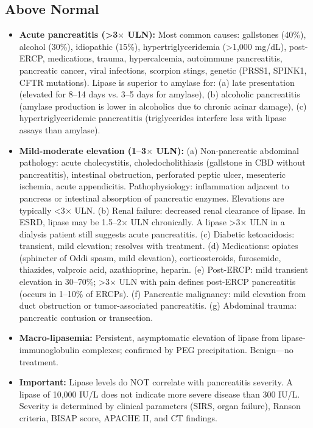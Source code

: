 \subsection*{Above Normal}
\begin{itemize}
  \item \textbf{Acute pancreatitis (>3$\times$ ULN):} Most common causes: gallstones (40\%), alcohol (30\%), idiopathic (15\%), hypertriglyceridemia (>1,000 mg/dL), post-ERCP, medications, trauma, hypercalcemia, autoimmune pancreatitis, pancreatic cancer, viral infections, scorpion stings, genetic (PRSS1, SPINK1, CFTR mutations). Lipase is superior to amylase for: (a) late presentation (elevated for 8--14 days vs. 3--5 days for amylase), (b) alcoholic pancreatitis (amylase production is lower in alcoholics due to chronic acinar damage), (c) hypertriglyceridemic pancreatitis (triglycerides interfere less with lipase assays than amylase).
  \item \textbf{Mild-moderate elevation (1--3$\times$ ULN):} (a) Non-pancreatic abdominal pathology: acute cholecystitis, choledocholithiasis (gallstone in CBD without pancreatitis), intestinal obstruction, perforated peptic ulcer, mesenteric ischemia, acute appendicitis. Pathophysiology: inflammation adjacent to pancreas or intestinal absorption of pancreatic enzymes. Elevations are typically <3$\times$ ULN. (b) Renal failure: decreased renal clearance of lipase. In ESRD, lipase may be 1.5--2$\times$ ULN chronically. A lipase >3$\times$ ULN in a dialysis patient still suggests acute pancreatitis. (c) Diabetic ketoacidosis: transient, mild elevation; resolves with treatment. (d) Medications: opiates (sphincter of Oddi spasm, mild elevation), corticosteroids, furosemide, thiazides, valproic acid, azathioprine, heparin. (e) Post-ERCP: mild transient elevation in 30--70\%; >3$\times$ ULN with pain defines post-ERCP pancreatitis (occurs in 1--10\% of ERCPs). (f) Pancreatic malignancy: mild elevation from duct obstruction or tumor-associated pancreatitis. (g) Abdominal trauma: pancreatic contusion or transection.
  \item \textbf{Macro-lipasemia:} Persistent, asymptomatic elevation of lipase from lipase-immunoglobulin complexes; confirmed by PEG precipitation. Benign---no treatment.
  \item \textbf{Important:} Lipase levels do NOT correlate with pancreatitis severity. A lipase of 10,000 IU/L does not indicate more severe disease than 300 IU/L. Severity is determined by clinical parameters (SIRS, organ failure), Ranson criteria, BISAP score, APACHE II, and CT findings.
\end{itemize}

